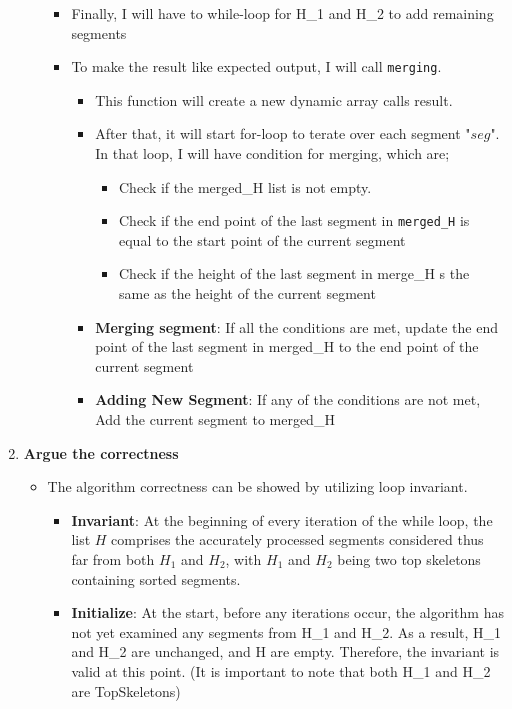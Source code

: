 \documentclass{article}
\begin{document}
\begin{enumerate}[label=({\alph*})]
\begin{enumerate}
\begin{itemize}
\begin{itemize}
\begin{itemize}
\begin{itemize}
					\end{itemize}
				\end{itemize}
			\end{itemize}
			\item Finally, I will have to while-loop for H\_1 and H\_2 to add remaining segments
			\item To make the result like expected output, I will call \verb|merging|.
			\begin{itemize}
				\item This function will create a new dynamic array calls result. 
				\item After that, it will start for-loop to terate over each segment "\(seg\)". In that loop, I will have condition for merging, which are;
				\begin{itemize}
					\item Check if the merged\_H list is not empty.
					\item Check if the end point of the last segment in \verb|merged_H|  is equal to the start point of the current segment
					\item Check if the height of the last segment in merge\_H s the same as the height of the current segment
				\end{itemize}
				\item \textbf{Merging segment}: If all the conditions are met, update the end point of the last segment in merged\_H to the end point of the current segment 
				\item \textbf{Adding New Segment}: If any of the conditions are not met, Add the current segment to merged\_H 
			\end{itemize}
		\end{itemize}
		\end{enumerate}
		\item \textbf{Argue the correctness}
		\begin{itemize}
			\item The algorithm correctness can be showed by utilizing loop invariant.
			\begin{itemize}
				\item \textbf{Invariant}: At the beginning of every iteration of the while loop, the list $H$ comprises the accurately processed segments considered thus far from both $H_1$ and $H_2$, with $H_1$ and $H_2$ being two top skeletons containing sorted segments.
				\item \textbf{Initialize}: At the start, before any iterations occur, the algorithm has not yet examined any segments from H\_1 and H\_2. As a result, H\_1 and H\_2 are unchanged, and H are empty. Therefore, the invariant is valid at this point. (It is important to note that both H\_1 and H\_2 are TopSkeletons)		

\end{itemize}
\end{itemize}
\end{enumerate}
\end{document}
